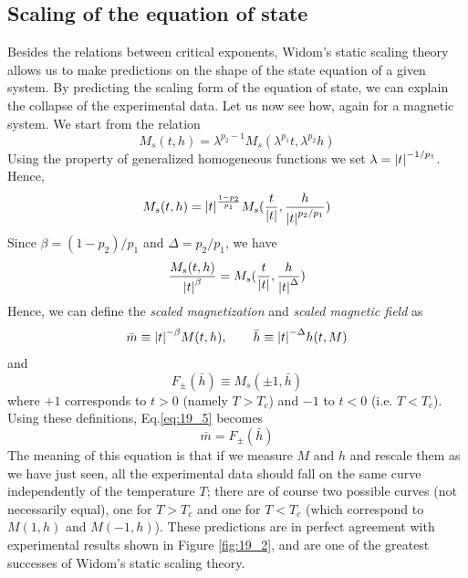 \documentclass[../main/main.tex]{subfiles}
\begin{document}
\subsection{Scaling of the equation of state}
Besides the relations between critical exponents, Widom's static scaling theory allows us to make predictions on the shape of the state equation of a given system.
By predicting the scaling form of the equation of state, we can explain the collapse of the experimental data. Let us now see how, again for a magnetic system. We start from the relation
\begin{equation*}
  M_s (t,h) = \lambda ^{p_2 - 1} M_s (\lambda ^{p_1} t, \lambda ^{p_2} h)
\end{equation*}
Using the property of generalized homogeneous functions we set \( \lambda = \abs{t}^{-1/p_1}  \). Hence,
\begin{equation*}
  M_s (t,h) = \abs{t}^{\frac{1-p_2}{p_1}} M_s ( \frac{t}{\abs{t} }, \frac{h}{\abs{t}^{p_2/p_1 } })
\end{equation*}
Since \( \beta = (1-p_2)/p_1 \) and \( \Delta = p_2/p_1 \), we have
\begin{equation}
  \frac{M_s (t,h)}{\abs{t}^{\beta } } = M_s ( \frac{t}{\abs{t} }, \frac{h}{\abs{t}^{\Delta } })
  \label{eq:19_5}
\end{equation}
Hence, we can define the \emph{scaled magnetization} and \emph{scaled magnetic field}  as
\begin{equation}
    \bar{m} \equiv \abs{t}^{-\beta } M(t,h), \qquad \bar{h} \equiv \abs{t}^{-\Delta } h (t,M)
\end{equation}
and
\begin{equation}
  F_{\pm} ( \bar{h} ) \equiv M_s (\pm1, \bar{h} )
\end{equation}
where \( +1 \)  corresponds to \( t>0 \)  (namely \( T>T_c \)) and \( -1 \)  to \( t<0 \)  (i.e. \( T<T_c \)).
Using these definitions, Eq.\eqref{eq:19_5} becomes
\begin{equation}
  \bar{m} = F_{\pm} (\bar{h} )
\end{equation}
The meaning of this equation is that if we measure \( M \) and \( h \) and rescale them as we have just seen, all the experimental data should fall on the same curve independently of the temperature \( T \); there are of course two possible curves (not necessarily equal), one for \( T>T_c \)  and one for \( T<T_c \)  (which correspond to \( M(1,h) \) and \( M(-1,h) \)). These predictions are in perfect agreement with experimental results shown in Figure \ref{fig:19_2}, and are one of the greatest successes of Widom's static scaling theory.
\end{document}

